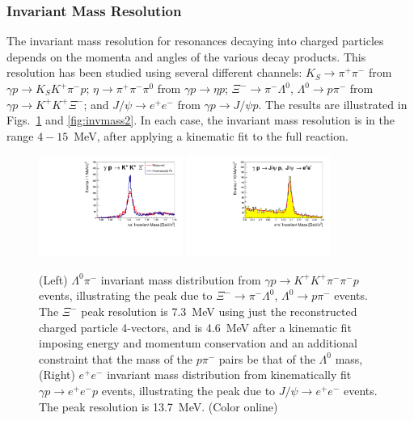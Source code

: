 \subsubsection{Invariant Mass Resolution \label{sec:perfchargedresol}}

The invariant mass resolution for resonances decaying into charged particles depends on the momenta and angles of the various decay products.  This resolution has been studied using several different channels:  $K_S\to\pi^+\pi^-$ from $\gamma p \to K_S K^+ \pi^- p$; $\eta \to \pi^+\pi^-\pi^0$ from $\gamma p \to \eta p$; $\Xi^- \to \pi^- \Lambda^0$, $\Lambda^0 \to p \pi^-$ from $\gamma p \to K^+ K^+ \Xi^-$; and $J/\psi \to e^+ e^-$ from $\gamma p \to J/\psi p$.  The results are illustrated in Figs.~\ref{fig:invmass1} and \ref{fig:invmass2}.    In each case, the invariant mass resolution is in the range $4-15$~MeV, after applying a kinematic fit to the full reaction.

\begin{figure}[tpb]
\begin{center}
\includegraphics[width=0.42\textwidth]{figures/XimMass_2017-ver30.pdf}
\includegraphics[width=0.42\textwidth]{figures/jpsi_mass.pdf}
\caption{\label{fig:invmass1}
(Left) $\Lambda^0\pi^-$ invariant mass distribution from $\gamma p \to K^+ K^+ \pi^- \pi^- p$ events, illustrating the peak due to $\Xi^- \to \pi^- \Lambda^0$, $\Lambda^0 \to p \pi^-$ events.  The $\Xi^-$ peak resolution is 7.3~MeV using just the reconstructed charged particle 4-vectors, and is 4.6~MeV after a kinematic fit imposing energy and momentum conservation and an additional constraint that the mass of the $p \pi^-$ pairs be that of the $\Lambda^0$ mass,   (Right) $e^+e^-$ invariant mass distribution from kinematically fit $\gamma p \to e^+e^- p$ events, illustrating the peak due to $J/\psi\to e^+e^-$ events.  The peak resolution is 13.7~MeV. (Color online)}
\end{center}
\end{figure}

